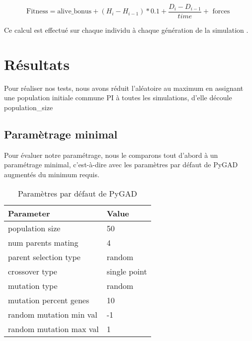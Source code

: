 \documentclass[journal, a4paper]{IEEEtran}
\begin{document}
		\begin{equation}\label{eq:equation}
			\text{{Fitness}} =
			\text{{alive\_bonus}}
			+ (H_{i} - H_{i-1}) * 0 .1
			+ \dfrac{D_{i} - {D_{i-1}}}{time}
			+ \text{{ forces }}
		\end{equation}

		Ce calcul est effectué sur chaque individu à chaque génération
		de la simulation . \\
\section{Résultats}\label{sec:resultats}
Pour réaliser nos tests, nous avons réduit l'aléatoire au maximum en
	 assignant une population initiale commune PI à toutes les
		simulations, d'elle découle population\_size
\subsection{Paramètrage minimal}\label{subsec:parametrage-minimal}
	Pour évaluer notre paramétrage, nous le comparons tout d'abord
	à un paramétrage minimal, c'est-à-dire avec les paramètres par
	défaut de PyGAD augmentés du minimum requis.
	\begin{table}[!hbt]
		\caption{Paramètres par défaut de PyGAD}
		\label{tab:PyGAD_parameters_default}
		\begin{tabular}{|l|l|}
			\hline
			\textbf{Parameter} & \textbf{Value} \\
			\hline
			population size & 50 \\
			\hline
			num parents mating & 4 \\
			\hline
			parent selection type & random \\
			\hline
			crossover type & single point \\
			\hline
			mutation type & random \\
			\hline
			mutation percent genes & 10 \\
			\hline
			random mutation min val & -1 \\
			\hline
			random mutation max val & 1 \\
			\hline
			\end{tabular}
	\end{table}
\end{document}
